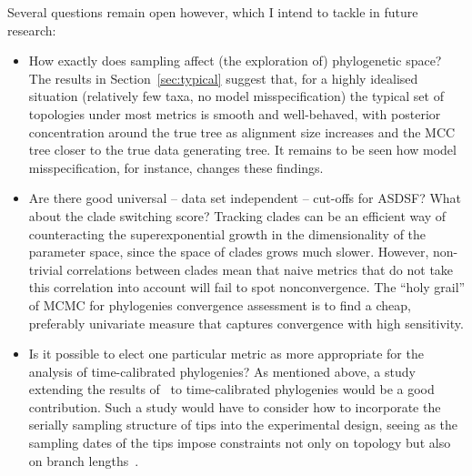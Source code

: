 Several questions remain open however, which I intend to tackle in future research:

\begin{itemize}
 \item How exactly does sampling affect (the exploration of) phylogenetic space?
 The results in Section~\ref{sec:typical} suggest that, for a highly idealised situation (relatively few taxa, no model misspecification) the typical set of topologies under most metrics is smooth and well-behaved, with posterior concentration around the true tree as alignment size increases and the MCC tree closer to the true data generating tree.
 It remains to be seen how model misspecification, for instance, changes these findings.
 \item Are there good universal  -- data set independent -- cut-offs for ASDSF? What about the clade switching score?
 Tracking clades can be an efficient way of counteracting the superexponential growth in the dimensionality of the parameter space, since the space of clades grows much slower.
 However, non-trivial correlations between clades mean that naive metrics that do not take this correlation into account will fail to spot nonconvergence.
 The ``holy grail'' of  MCMC for phylogenies convergence assessment is to find a cheap, preferably univariate measure that captures convergence with high sensitivity.
 \item Is it possible to elect one particular metric as more appropriate for the analysis of time-calibrated phylogenies?
 As mentioned above, a study extending the results of~\cite{Kuhner2014} to time-calibrated phylogenies would be a good contribution.
 Such a study would have to consider how to incorporate the serially sampling structure of tips into the experimental design, seeing as the sampling dates of the tips impose constraints not only on topology but also on branch lengths~\citep{Moller2018}.
\end{itemize}

% 